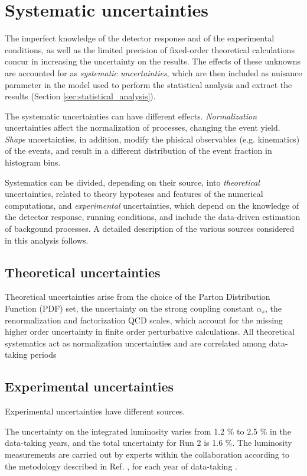 \section{Systematic uncertainties}
The imperfect knowledge of the detector response and of the experimental conditions, as well as the limited precision of fixed-order theoretical calculations concur in increasing the uncertainty on the results.
The effects of these unknowns are accounted for as \textit{systematic uncertainties}, which are then included as nuisance parameter in the model used to perform the statistical analysis and extract the results (Section \ref{sec:statistical_analysis}).

The systematic uncertainties can have different effects.
\textit{Normalization} uncertainties affect the normalization of processes, changing the event yield.
\textit{Shape} uncertainties, in addition, modify the phisical observables (e.g. kinematics) of the events, and result in a different distribution of the event fraction in histogram bins.

Systematics can be divided, depending on their source, into \textit{theoretical} uncertainties, related to theory hypoteses and features of the numerical computations, and \textit{experimental} uncertainties, which depend on the knowledge of the detector response, running conditions, and include the data-driven estimation of backgound processes.
A detailed description of the various sources considered in this analysis follows.

\subsection{Theoretical uncertainties}
Theoretical uncertainties arise from the choice of the Parton Distribution Function (PDF) set, the uncertainty on the strong coupling constant $\alpha_s$, the renormalization and factorization QCD scales, which account for the missing higher order uncertainty in finite order perturbative calculations.
All theoretical systematics act as normalization uncertainties and are correlated among data-taking periods

\subsection{Experimental uncertainties}
Experimental uncertainties have different sources.

The uncertainty on the integrated luminosity varies from 1.2 \% to 2.5 \% in the data-taking years, and the total uncertainty for Run 2 is 1.6 \%.
The luminosity measurements are carried out by experts within the collaboration according to the metodology described in Ref. \cite{CMS:LUM-17-003}, for each year of data-taking \cite{CMS:LUM-17-004, CMS:LUM-18-002}.

